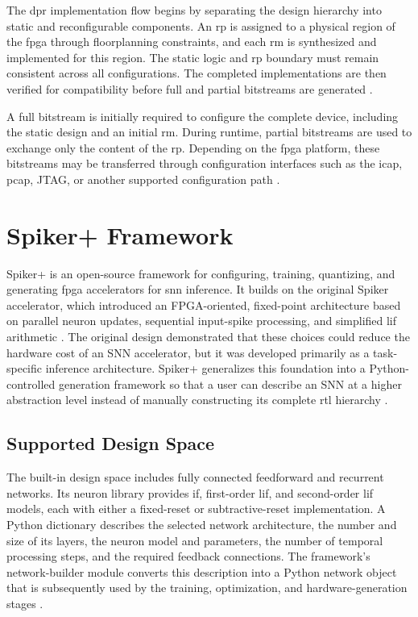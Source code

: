 The \gls{dpr} implementation flow begins by separating the design hierarchy into static and reconfigurable components. An \gls{rp} is assigned to a physical region of the \gls{fpga} through floorplanning constraints, and each \gls{rm} is synthesized and implemented for this region. The static logic and \gls{rp} boundary must remain consistent across all configurations. The completed implementations are then verified for compatibility before full and partial bitstreams are generated \cite{UG909}.

A full bitstream is initially required to configure the complete device, including the static design and an initial \gls{rm}. During runtime, partial bitstreams are used to exchange only the content of the \gls{rp}. Depending on the \gls{fpga} platform, these bitstreams may be transferred through configuration interfaces such as the \gls{icap}, \gls{pcap}, JTAG, or another supported configuration path \cite{UG909}.

\section{Spiker+ Framework}
\label{subsec: spiker framework}

Spiker+ is an open-source framework for configuring, training, quantizing, and generating \gls{fpga} accelerators for \gls{snn} inference. It builds on the original Spiker accelerator, which introduced an FPGA-oriented, fixed-point architecture based on parallel neuron updates, sequential input-spike processing, and simplified \gls{lif} arithmetic \cite{Carpegna2022}. The original design demonstrated that these choices could reduce the hardware cost of an SNN accelerator, but it was developed primarily as a task-specific inference architecture. Spiker+ generalizes this foundation into a Python-controlled generation framework so that a user can describe an SNN at a higher abstraction level instead of manually constructing its complete \gls{rtl} hierarchy \cite{Carpegna2025}.

\subsection{Supported Design Space}

The built-in design space includes fully connected feedforward and recurrent networks. Its neuron library provides \gls{if}, first-order \gls{lif}, and second-order \gls{lif} models, each with either a fixed-reset or subtractive-reset implementation. A Python dictionary describes the selected network architecture, the number and size of its layers, the neuron model and parameters, the number of temporal processing steps, and the required feedback connections. The framework's network-builder module converts this description into a Python network object that is subsequently used by the training, optimization, and hardware-generation stages \cite{Carpegna2025}.

